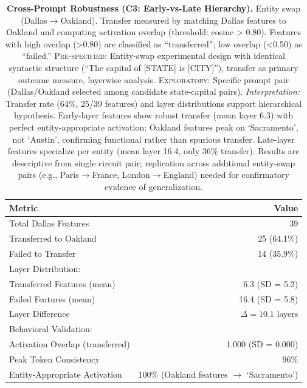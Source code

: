 \begin{table}[H]
\centering
\caption{\textbf{Cross-Prompt Robustness (C3: Early-vs-Late Hierarchy).} Entity swap (Dallas$\rightarrow$Oakland). Transfer measured by matching Dallas features to Oakland and computing activation overlap (threshold: cosine > 0.80). Features with high overlap (>0.80) are classified as ``transferred''; low overlap (<0.50) as ``failed.'' \textsc{Pre-specified:} Entity-swap experimental design with identical syntactic structure (``The capital of [STATE] is [CITY]''), transfer as primary outcome measure, layerwise analysis. \textsc{Exploratory:} Specific prompt pair (Dallas/Oakland selected among candidate state-capital pairs). \emph{Interpretation:} Transfer rate (64\%, 25/39 features) and layer distributions support hierarchical hypothesis. Early-layer features show robust transfer (mean layer 6.3) with perfect entity-appropriate activation: Oakland features peak on `Sacramento', not `Austin', confirming functional rather than spurious transfer. Late-layer features specialize per entity (mean layer 16.4, only 36\% transfer). Results are descriptive from single circuit pair; replication across additional entity-swap pairs (e.g., Paris$\rightarrow$France, London$\rightarrow$England) needed for confirmatory evidence of generalization.}
\label{tab:cross-prompt}
\begin{tabular}{lr}
\toprule
\textbf{Metric} & \textbf{Value} \\
\midrule
Total Dallas Features                 & 39 \\
Transferred to Oakland                & 25 (64.1\%) \\
Failed to Transfer                    & 14 (35.9\%) \\
Layer Distribution:                   & \\
\quad Transferred Features (mean)     & 6.3 (SD = 5.2) \\
\quad Failed Features (mean)          & 16.4 (SD = 5.8) \\
\quad Layer Difference                & $\Delta = 10.1$ layers \\
Behavioral Validation:                & \\
\quad Activation Overlap (transferred)& 1.000 (SD = 0.000) \\
\quad Peak Token Consistency          & 96\% \\
\quad Entity-Appropriate Activation   & 100\% (Oakland features $\rightarrow$ `Sacramento') \\
\bottomrule
\end{tabular}
\end{table}


